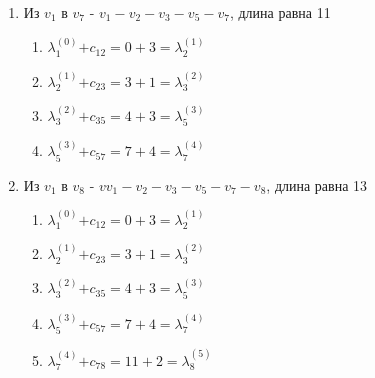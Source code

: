 \documentclass{article}
\newcommand\ld[2]{$\lambda^{(#1)}_{#2}$}
\begin{document}
\begin{enumerate}
\item Из $v_1$ в $v_7$ - $v_1 - v_2 - v_3 - v_5 - v_7$, длина равна 11
\begin{enumerate}
    \item \ld{0}{1}$+ c_{12} = 0 + 3 =$\ld{1}{2}
    \item \ld{1}{2}$+ c_{23} = 3 + 1 =$\ld{2}{3}
    \item \ld{2}{3}$+ c_{35} = 4 + 3 =$\ld{3}{5}
    \item \ld{3}{5}$+ c_{57} = 7 + 4 =$\ld{4}{7}
\end{enumerate}

\item Из $v_1$ в $v_8$ - $vv_1 - v_2 - v_3 - v_5 - v_7 - v_8$, длина равна 13
\begin{enumerate}
    \item \ld{0}{1}$+ c_{12} = 0 + 3 =$\ld{1}{2}
    \item \ld{1}{2}$+ c_{23} = 3 + 1 =$\ld{2}{3}
    \item \ld{2}{3}$+ c_{35} = 4 + 3 =$\ld{3}{5}
    \item \ld{3}{5}$+ c_{57} = 7 + 4 =$\ld{4}{7}
    \item \ld{4}{7}$+ c_{78} = 11 + 2 =$\ld{5}{8}
\end{enumerate}
\end{enumerate}
\end{document}
